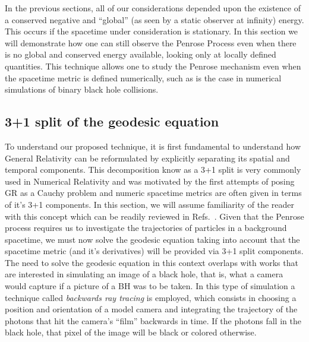 In the previous sections, all of our considerations depended upon the existence of a conserved negative and ``global'' (as seen by a static observer at infinity) energy. This occurs if the spacetime under consideration is stationary. In this section we will demonstrate how one can still observe the Penrose Process even when there is no global and conserved energy available, looking only at locally defined quantities. This technique allows one to study the Penrose mechanism even when the spacetime metric is defined numerically, such as is the case in numerical simulations of binary black hole collisions.

\subsection{3+1 split of the geodesic equation}

To understand our proposed technique, it is first fundamental to understand how General Relativity can be reformulated by explicitly separating its spatial and temporal components. This decomposition know as a 3+1 split is very commonly used in Numerical Relativity and was motivated by the first attempts of posing GR as a Cauchy problem and numeric spacetime metrics are often given in terms of it's 3+1 components. In this section, we will assume familiarity of the reader with this concept which can be readily reviewed in Refs.~\cite{Alcubierre2012-xp, 9780521514071, 9781108928250}. Given that the Penrose process requires us to investigate the trajectories of particles in a background spacetime, we must now solve the geodesic equation taking into account that the spacetime metric (and it's derivatives) will be provided via 3+1 split components. The need to solve the geodesic equation in this context overlaps with works that are interested in simulating an image of a black hole, that is, what a camera would capture if a picture of a BH was to be taken. In this type of simulation a technique called \emph{backwards ray tracing} is employed, which consists in choosing a position and orientation of a model camera and integrating the trajectory of the photons that hit the camera's ``film'' backwards in time. If the photons fall in the black hole, that pixel of the image will be black or colored otherwise.

